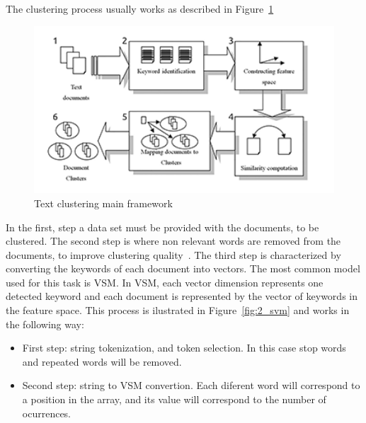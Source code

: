 The clustering process usually works as described in Figure~\ref{fig:1_Text_Clustering_Main_Framwork}
\begin{figure}
  \begin{center}
    \includegraphics[width=12cm]{images/1_Text_Clustering_Main_Framwork.png}
  \end{center}
  \caption{ Text clustering main framework~\cite{Dozono2012} }
  \label{fig:1_Text_Clustering_Main_Framwork}
\end{figure}
In the first, step a data set must be provided with the documents, to be clustered. The second step is where non relevant words are removed from the documents, to improve clustering quality~\cite{Kang2003}. 
The third step is characterized by converting the keywords of each document into vectors. The most common model used for this task is \ac{VSM}. In \ac{VSM}, each vector dimension represents one detected keyword and each document is represented by the vector of keywords in the feature space. This process is ilustrated in Figure~\ref{fig:2_svm} and works in the following way:
\begin{itemize}
  \item First step: string tokenization, and token selection. In this case stop words and repeated words will be removed.
  \item Second step: string to \ac{VSM} convertion. Each diferent word will correspond to a position in the array, and its value will correspond to the number of ocurrences. 
\end{itemize}

